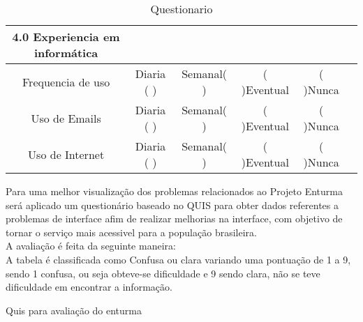 \begin{itemize}
		\begin{table}
		\centering
		\begin{tabular}{|c|c|c|c|c|c|} 

		\hline
			\textbf{4.0 Experiencia em informática}\\ 
		\hline
		   Frequencia de uso & Diaria ( ) & Semanal( ) & ( )Eventual & ( )Nunca &  \\
		\hline
		   Uso de Emails & Diaria ( ) & Semanal( ) & ( )Eventual & ( )Nunca &  \\
		\hline
			Uso de Internet& Diaria ( ) & Semanal( ) & ( )Eventual & ( )Nunca & \\
		\hline
		\end{tabular}
		\caption{Questionario}

		\end{table}



	Para uma melhor visualização dos problemas relacionados ao Projeto Enturma será aplicado um questionário baseado no QUIS para obter dados referentes a problemas de interface afim de realizar melhorias na interface, com objetivo de tornar o serviço mais acessivel para a população brasileira. \\

	A avaliação é feita da seguinte maneira:\\
		A tabela é classificada como Confusa ou clara variando uma pontuação de 1 a 9, sendo 1 confusa, ou seja  obteve-se dificuldade e 9 sendo clara, não se teve dificuldade em encontrar a informação.

		\begin{table}[H]
	{Quis para avaliação do enturma}
	\centering
	\begin{tabular}{|c|c|c|c|c|c|c|c|c|c|c|c|c|c|c|} 


\end{tabular}
\end{table}
\end{itemize}
